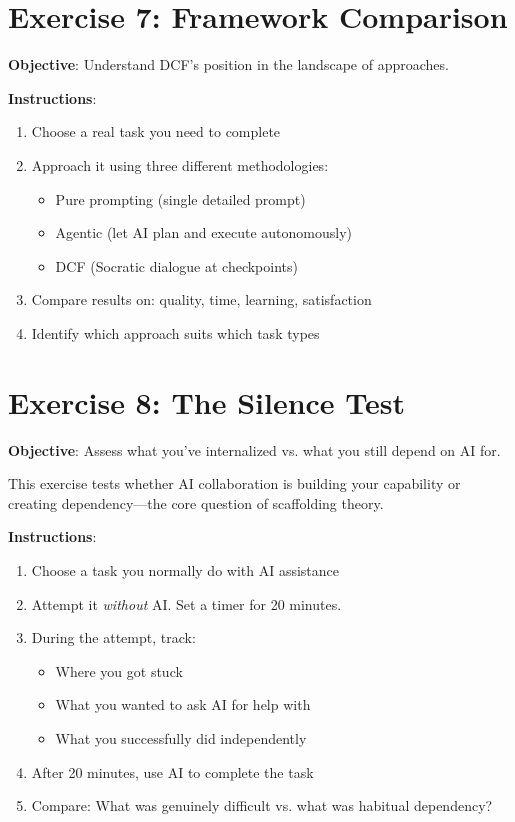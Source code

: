 \section{Exercise 7: Framework Comparison}

\textbf{Objective}: Understand DCF's position in the landscape of approaches.

\textbf{Instructions}:
\begin{enumerate}
    \item Choose a real task you need to complete
    \item Approach it using three different methodologies:
    \begin{itemize}
        \item Pure prompting (single detailed prompt)
        \item Agentic (let AI plan and execute autonomously)
        \item DCF (Socratic dialogue at checkpoints)
    \end{itemize}
    \item Compare results on: quality, time, learning, satisfaction
    \item Identify which approach suits which task types
\end{enumerate}

\section{Exercise 8: The Silence Test}

\textbf{Objective}: Assess what you've internalized vs. what you still depend on AI for.

This exercise tests whether AI collaboration is building your capability or creating dependency---the core question of scaffolding theory.

\textbf{Instructions}:
\begin{enumerate}
    \item Choose a task you normally do with AI assistance
    \item Attempt it \emph{without} AI. Set a timer for 20 minutes.
    \item During the attempt, track:
    \begin{itemize}
        \item Where you got stuck
        \item What you wanted to ask AI for help with
        \item What you successfully did independently
    \end{itemize}
    \item After 20 minutes, use AI to complete the task
    \item Compare: What was genuinely difficult vs. what was habitual dependency?
\end{enumerate}

